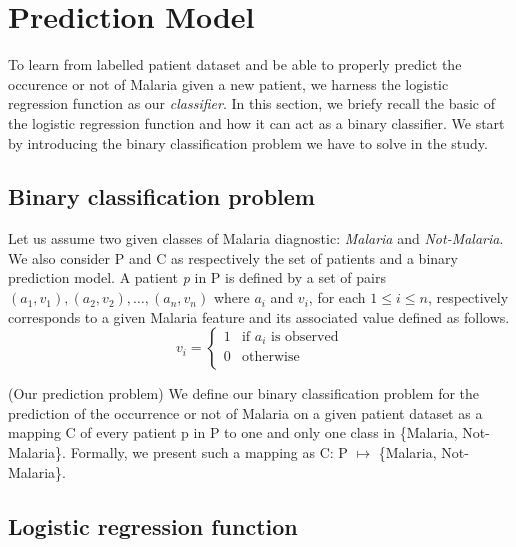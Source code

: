 \section{Prediction Model}\label{prediction_model}
To learn from labelled patient dataset and be able to properly predict 
the occurence or not of Malaria given a new patient, we harness the logistic 
regression function as our \emph{classifier}. 
In this section, we briefy recall the basic of the logistic regression function
and how it can act as a binary classifier. We start by introducing the binary 
classification problem we have to solve in the study.

\subsection{Binary classification problem}
Let us assume two given classes of Malaria diagnostic: \emph{Malaria} and \emph{Not-Malaria}.
We also consider \textsc{P} and \textsc{C} as respectively the set of patients and a binary prediction model.
A patient \emph{p} in \textsc{P} is defined by a set of pairs $(a_1, v_1), (a_2, v_2), \ldots, (a_n, v_n)$
where $a_i$ and $v_i$, for each $1\leq i\leq n$, respectively corresponds to a given Malaria feature and its associated value defined
as follows.
\begin{equation}
v_i = \left\{
\begin{array}{rl}
1 &\text{if $a_i$ is observed} \\
0 &\text{otherwise} \\
\end{array}
\right.
\end{equation}

\begin{definition}{(Our prediction problem)}
We define our binary classification problem for the prediction of the occurrence
 or not of Malaria on a given patient dataset as a mapping \textsc{C} of every patient p in \textsc{P} 
to one and only one class in \{Malaria, Not-Malaria\}. Formally, we present such a mapping as \textsc{C}: \textsc{P} $\mapsto$ \{Malaria, Not-Malaria\}.
\end{definition}
\subsection{Logistic regression function}
